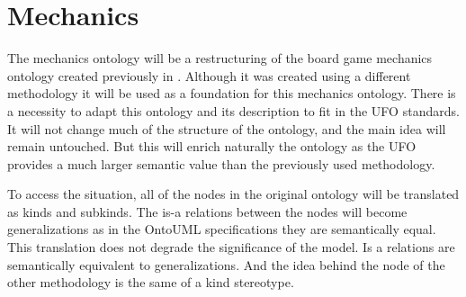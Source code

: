 \section{Mechanics}
The mechanics ontology will be a restructuring of the board game mechanics ontology created previously in \cite{kritz_buildingOntology}. Although it was created using a different methodology it will be used as a foundation for this mechanics ontology. There is a necessity to adapt this ontology and its description to fit in the UFO standards. It will not change much of the structure of the ontology, and the main idea will remain untouched. But this will enrich naturally the ontology as the UFO provides a much larger semantic value than the previously used methodology.

To access the situation, all of the nodes in the original ontology will be translated as kinds and subkinds. The is-a relations between the nodes will become generalizations as in the OntoUML specifications they are semantically equal. This translation does not degrade the significance of the model. Is a relations are semantically equivalent to generalizations. And the idea behind the node of the other methodology is the same of a kind stereotype.
